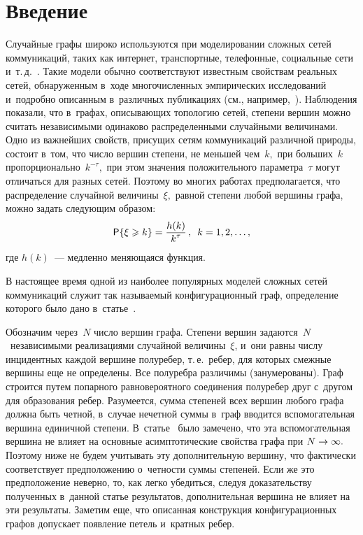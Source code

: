 


\thispagestyle{headings}

\begin{multicols}{2}

\label{st\stat}

\section{Введение}
\label{SC:1}

Случайные графы широко используются при моделировании сложных сетей коммуникаций, таких как 
интернет, транспортные, телефонные, социальные сети и~т.\,д.~\cite{Hof}. 
Такие модели обычно соответствуют известным свойствам реальных сетей, обнаруженным в~ходе 
многочисленных эмпирических исследований и~подробно описанным в~различных публикациях 
(см., например,~\cite{Fal}). Наблюдения показали, что в~графах, описывающих топологию сетей, 
степени вершин можно считать независимыми одинаково распределенными случайными величинами. 
Одно из важнейших свойств, присущих сетям коммуникаций различной природы, состоит в~том, 
что число вершин степени, не меньшей чем~$k,$ при больших~$k$ пропорционально~$k^{-\tau},$ при 
этом значения положительного параметра~$\tau$ могут отличаться для разных сетей. 
Поэтому во многих работах предполагается, что распределение случайной величины~$\xi,$ равной 
степени любой вершины графа, можно задать следующим образом:
\begin{equation}
\label{EQ:1}
\mathsf{P}\{\xi \geqslant k\} = \displaystyle\frac{\displaystyle h(k)\mathstrut}{\displaystyle k^\tau\mathstrut}\,,\enskip k=1,2,\ldots,
\end{equation}
где $h(k)$~--- медленно меняющаяся функция.

В настоящее время одной из наиболее популярных моделей сложных сетей коммуникаций 
служит так называемый конфигурационный граф, определение которого было дано в~статье~\cite{Bol}. 

Обозначим через~$N$ число вершин графа. Степени вершин задаются~$N$~независимыми реализациями 
случайной величины~$\xi$, и~они равны числу инцидентных каждой вершине полуребер, т.\,е.\ 
ребер, для которых смежные вершины еще не определены. Все полуребра различимы (занумерованы).
 Граф строится путем попарного равновероятного соединения полуребер друг с~другом для образования ребер. 
 Разумеется, сумма степеней всех вершин любого графа должна быть четной, в~случае нечетной суммы в~граф 
 вводится вспомогательная вершина единичной степени. В~статье~\cite{RN1} было замечено, что эта 
 вспомогательная вершина не влияет на основные асимптотические свойства графа при $N\hm\rightarrow \infty.$ 
 Поэтому ниже не будем учитывать эту дополнительную вершину, что фактически соответствует 
 предположению о~чет\-ности суммы степеней. Если же это предположение неверно, то, как легко 
 убедиться, следуя доказательству полученных в~данной \mbox{статье} результатов, дополнительная вершина 
 не влияет на эти результаты. Заметим еще, что описанная конструкция конфигурационных графов 
 допускает появление петель и~кратных ребер.


\end{multicols}
